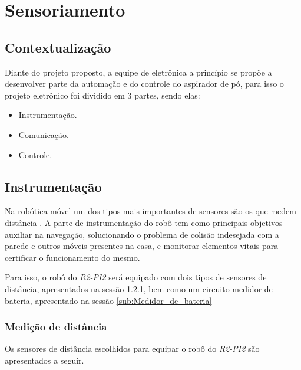 \section{Sensoriamento} %
\label{sec:sensoriamento}
\subsection{Contextualização}

Diante do projeto proposto, a equipe de eletrônica a princípio se propõe a desenvolver parte da automação e do controle do aspirador de pó, para isso o projeto eletrônico foi dividido em 3 partes, sendo elas:
  \begin{itemize}
    \item Instrumentação.
    \item Comunicação.
    \item Controle.
  \end{itemize}

\subsection{Instrumentação} %
\label{sub:instrumentação}


	Na robótica móvel um dos tipos mais importantes de sensores são os que medem distância \cite{braunl}. A parte de instrumentação do robô tem como principais objetivos auxiliar na navegação, solucionando o problema de colisão indesejada com a parede e outros móveis presentes na casa, e monitorar elementos vitais para certificar o funcionamento do mesmo.

	Para isso, o robô do \textit{R2-PI2} será equipado com dois tipos de sensores de distância, apresentados na sessão \ref{sub:Medição_de_distância}, bem como um circuito medidor de bateria, apresentado na sessão \ref{sub:Medidor_de_bateria}

\subsubsection{Medição de distância}
\label{sub:Medição_de_distância}
	Os sensores de distância escolhidos para equipar o robô do \textit{R2-PI2} são apresentados a seguir.
  
